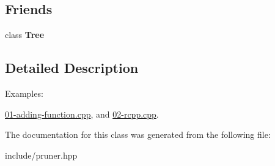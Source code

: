 \subsection*{Friends}
\begin{DoxyCompactItemize}
\item 
class {\bfseries Tree}\hypertarget{classpruner_1_1TreeIterator_a4b682814d14447120dd184fd300deade}{}\label{classpruner_1_1TreeIterator_a4b682814d14447120dd184fd300deade}

\end{DoxyCompactItemize}


\subsection{Detailed Description}
\begin{Desc}
\item[Examples\+: ]\par
\hyperlink{01-adding-function_8cpp-example}{01-\/adding-\/function.\+cpp}, and \hyperlink{02-rcpp_8cpp-example}{02-\/rcpp.\+cpp}.\end{Desc}


The documentation for this class was generated from the following file\+:\begin{DoxyCompactItemize}
\item 
include/pruner.\+hpp\end{DoxyCompactItemize}
